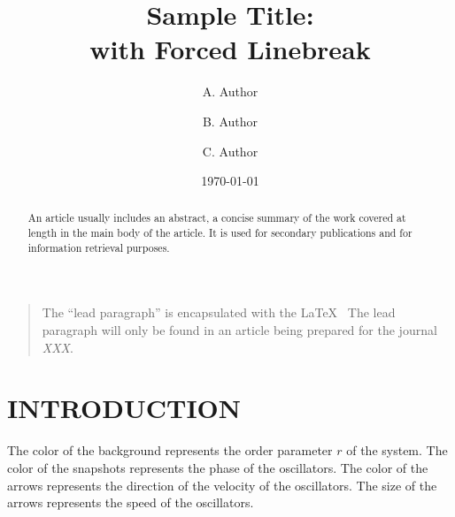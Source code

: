 \documentclass[%
 aip,
 amsmath,amssymb,
 reprint,%
]{revtex4-1}
\begin{document}

\title[Sample title]{Sample Title:\\with Forced Linebreak}
\author{A. Author}
\author{B. Author}%
%

\author{C. Author}
%

\date{\today}%

\begin{abstract}
    An article usually includes an abstract, a concise summary of the work
    covered at length in the main body of the article. It is used for
    secondary publications and for information retrieval purposes. 
\end{abstract}

\maketitle

\begin{quotation}
    The ``lead paragraph'' is encapsulated with the \LaTeX\
    The lead paragraph will only be found in an article being prepared for the journal \textit{XXX}.
\end{quotation}

\section{\label{sec:level1}INTRODUCTION\protect\\ }
The color of the background represents the order parameter $r$ of the system. The color of the snapshots represents the phase of the oscillators. The color of the arrows represents the direction of the velocity of the oscillators. The size of the arrows represents the speed of the oscillators. 
\end{document}
